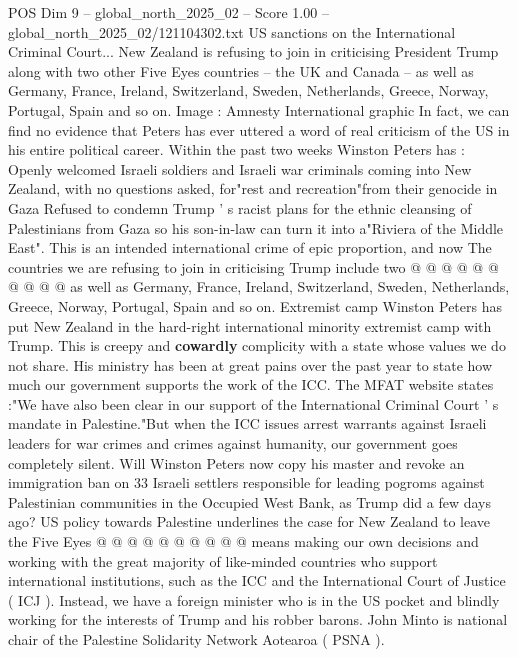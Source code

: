 \begin{textsample}{POS Dim 9 – global\_north\_2025\_02 – Score 1.00 – global\_north\_2025\_02/121104302.txt}  \label{ex:f9_pos_444}
US sanctions on the International Criminal Court...
New Zealand is refusing to join in criticising President Trump along with two other Five Eyes countries -- the UK and Canada -- as well as Germany, France, Ireland, Switzerland, Sweden, Netherlands, Greece, Norway, Portugal, Spain and so on.
Image : Amnesty International graphic In fact, we can find no evidence that Peters has ever uttered a word of real criticism of the US in his entire political career.
Within the past two weeks Winston Peters has : Openly welcomed Israeli soldiers and Israeli war criminals coming into New Zealand, with no questions asked, for"rest and recreation"from their genocide in Gaza Refused to condemn Trump ' s racist plans for the ethnic cleansing of Palestinians from Gaza so his son-in-law can turn it into a"Riviera of the Middle East".
This is an intended international crime of epic proportion, and now The countries we are refusing to join in criticising Trump include two @ @ @ @ @ @ @ @ @ @ as well as Germany, France, Ireland, Switzerland, Sweden, Netherlands, Greece, Norway, Portugal, Spain and so on.
Extremist camp Winston Peters has put New Zealand in the hard-right international minority extremist camp with Trump.
This is creepy and \textbf{cowardly} complicity with a state whose values we do not share.
His ministry has been at great pains over the past year to state how much our government supports the work of the ICC.
The MFAT website states :"We have also been clear in our support of the International Criminal Court ' s mandate in Palestine."But when the ICC issues arrest warrants against Israeli leaders for war crimes and crimes against humanity, our government goes completely silent.
Will Winston Peters now copy his master and revoke an immigration ban on 33 Israeli settlers responsible for leading pogroms against Palestinian communities in the Occupied West Bank, as Trump did a few days ago?
US policy towards Palestine underlines the case for New Zealand to leave the Five Eyes @ @ @ @ @ @ @ @ @ @ means making our own decisions and working with the great majority of like-minded countries who support international institutions, such as the ICC and the International Court of Justice ( ICJ ).
Instead, we have a foreign minister who is in the US pocket and blindly working for the interests of Trump and his robber barons.
John Minto is national chair of the Palestine Solidarity Network Aotearoa ( PSNA ).

\end{textsample}
